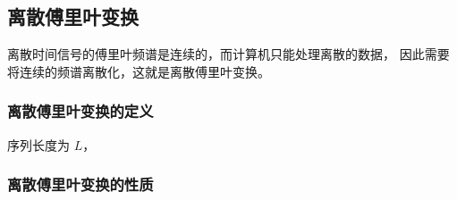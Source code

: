 \subsection{离散傅里叶变换}

离散时间信号的傅里叶频谱是连续的，而计算机只能处理离散的数据，
因此需要将连续的频谱离散化，这就是离散傅里叶变换。

\subsubsection{离散傅里叶变换的定义}

\begin{definition}
    序列长度为 $L$，
\end{definition}

\subsubsection{离散傅里叶变换的性质}

